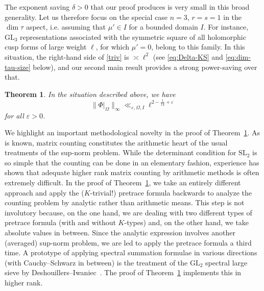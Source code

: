 \documentclass[11pt,oneside]{amsart}
\numberwithin{equation}{section}
\theoremstyle{remark}
\theoremstyle{plain}
\newtheorem{theorem}{Theorem}
\newcommand\GL{\mathrm{GL}}
\newcommand\SL{\mathrm{SL}}
\newcommand\eps{\varepsilon}
\begin{document}
The exponent saving $\delta>0$ that our proof produces is very small in this broad generality. Let us therefore focus on the special case $n=3$, $r=s=1$ in the $\dim\tau$ aspect, i.e. assuming that $\mu'\in I$ for a bounded domain $I$. For instance, $\GL_3$ representations associated with the symmetric square of all holomorphic cusp forms of large weight $\ell$, for which $\mu'=0$, belong to this family. In this situation, the right-hand side of \eqref{triv} is $\asymp\ell^2$ (see \eqref{eq:Delta-KS} and \eqref{eq:dim-tau-size} below), and our second main result provides a strong power-saving over that.

\begin{theorem}\label{thm2} In the situation described above, we have
$$\| \Phi|_{\Omega} \|_{\infty} \ll_{\eps,\Omega,I} \ell^{2 - \frac{1}{14} + \eps}$$
for all $\eps > 0$. 
\end{theorem}

We highlight an important methodological novelty in the proof of Theorem~\ref{thm2}. As is known, matrix counting constitutes the arithmetic heart of the usual treatments of the sup-norm problem. While the determinant condition for $\SL_2$ is so simple that the counting can be done in an elementary fashion, experience has shown that adequate higher rank matrix counting by arithmetic methods is often extremely difficult. In the proof of Theorem~\ref{thm2}, we take an entirely different approach and apply the ($K$-trivial!) pretrace formula backwards to analyze the counting problem by analytic rather than arithmetic means. This step is not involutory because, on the one hand, we are dealing with two different types of pretrace formula (with and without $K$-types) and, on the other hand, we take absolute values in between. Since the analytic expression involves another (averaged) sup-norm problem, we are led to apply the pretrace formula a third time. A prototype of applying spectral summation formulae in various directions (with Cauchy--Schwarz in between) is the treatment of the $\GL_2$ spectral large sieve by Deshouillers--Iwaniec~\cite{DeIw}. The proof of Theorem~\ref{thm2} implements this in higher rank.
\end{document}
